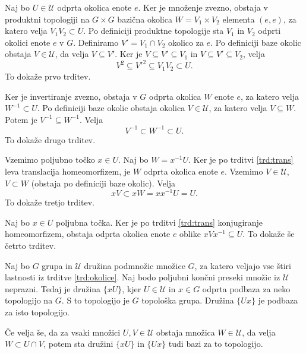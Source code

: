 \documentclass[mat1]{fmfdelo}
\newcommand{\Ucurl}{\mathcal{U}}
\begin{document}
\begin{dokaz}
Naj bo $U \in \Ucurl$  odprta okolica enote $e$. Ker je množenje zvezno, obstaja v produktni topologiji na $G \times G$ bazična okolica $W = V_1 \times V_2$ elementa $(e, e)$, za katero velja $V_1V_2 \subset U$. Po definiciji produktne topologije sta $V_1$ in $V_2$ odprti okolici enote $e$ v $G$. Definiramo $V' = V_1 \cap V_2$ okolico za $e$. Po definiciji baze okolic obstaja $V \in \Ucurl$, da velja $V \subseteq V'$. Ker je $V \subseteq V' \subseteq V_1$ in $V \subseteq V' \subseteq V_2$, velja \[V^2 \subseteq V'^2 \subseteq V_1V_2 \subset U.\] To dokaže prvo trditev.

Ker je invertiranje zvezno, obstaja v $G$ odprta okolica $W$ enote $e$, za katero velja $W^{-1} \subset U$. Po definiciji baze okolic obstaja okolica $V \in \Ucurl$, za katero velja $V \subseteq W$. Potem je $V^{-1} \subseteq W^{-1}$. Velja \[V^{-1} \subset W^{-1} \subset U.\] To dokaže drugo trditev.

Vzemimo poljubno točko $x \in U$. Naj bo $W = x^{-1}U$. Ker je po trditvi \ref{trd:trans} leva translacija homeomorfizem, je $W$ odprta okolica enote $e$. Vzemimo $V \in \Ucurl$, $V \subset W$ (obstaja po definiciji baze okolic). Velja \[xV \subset xW = xx^{-1}U = U.\]
To dokaže tretjo trditev.

Naj bo $x \in U$ poljubna točka. Ker je po trditvi \ref{trd:trans} konjugiranje homeomorfizem, obstaja odprta okolica enote $e$ oblike $xVx^{-1} \subseteq U$.
To dokaže še četrto trditev.
\end{dokaz}

\begin{izrek}\label{izr:bazaokolice}
Naj bo $G$ grupa in $\Ucurl$ družina podmnožic množice $G$, za katero veljajo vse štiri lastnosti iz trditve \ref{trd:okolice}. Naj bodo poljubni končni preseki množic iz $\Ucurl$ neprazni. Tedaj je družina $\lbrace xU \rbrace$, kjer $U \in \Ucurl$ in $x \in G$ odprta podbaza za neko topologijo na $G$. S to topologijo je $G$ topološka grupa. Družina $\lbrace Ux \rbrace$ je podbaza za isto topologijo.

Če velja še, da za vsaki množici $U,V \in \Ucurl$ obstaja množica $W \in \Ucurl$, da velja $W \subset U \cap V$, potem sta družini $\lbrace xU \rbrace$ in $\lbrace Ux \rbrace$ tudi bazi za to topologijo.
\end{izrek}
\end{document}
